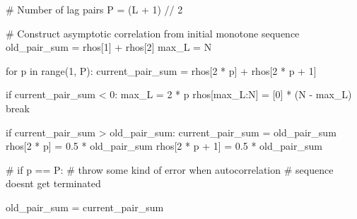 \documentclass[
  letterpaper,
  DIV=11,
  numbers=noendperiod]{scrartcl}
\newenvironment{Shaded}{\begin{snugshade}}{\end{snugshade}}
\newcommand{\BuiltInTok}[1]{\textcolor[rgb]{0.00,0.23,0.31}{#1}}
\newcommand{\CommentTok}[1]{\textcolor[rgb]{0.37,0.37,0.37}{#1}}
\newcommand{\ControlFlowTok}[1]{\textcolor[rgb]{0.00,0.23,0.31}{#1}}
\newcommand{\DecValTok}[1]{\textcolor[rgb]{0.68,0.00,0.00}{#1}}
\newcommand{\FloatTok}[1]{\textcolor[rgb]{0.68,0.00,0.00}{#1}}
\newcommand{\KeywordTok}[1]{\textcolor[rgb]{0.00,0.23,0.31}{#1}}
\newcommand{\NormalTok}[1]{\textcolor[rgb]{0.00,0.23,0.31}{#1}}
\newcommand{\OperatorTok}[1]{\textcolor[rgb]{0.37,0.37,0.37}{#1}}
\begin{document}
\begin{Shaded}
\begin{Highlighting}[]
  \CommentTok{\# Number of lag pairs}
\NormalTok{  P }\OperatorTok{=}\NormalTok{ (L }\OperatorTok{+} \DecValTok{1}\NormalTok{) }\OperatorTok{//} \DecValTok{2}
  
  \CommentTok{\# Construct asymptotic correlation from initial monotone sequence}
\NormalTok{  old\_pair\_sum }\OperatorTok{=}\NormalTok{ rhos[}\DecValTok{1}\NormalTok{] }\OperatorTok{+}\NormalTok{ rhos[}\DecValTok{2}\NormalTok{]}
\NormalTok{  max\_L }\OperatorTok{=}\NormalTok{ N}
  
  \ControlFlowTok{for}\NormalTok{ p }\KeywordTok{in} \BuiltInTok{range}\NormalTok{(}\DecValTok{1}\NormalTok{, P):}
\NormalTok{    current\_pair\_sum }\OperatorTok{=}\NormalTok{ rhos[}\DecValTok{2} \OperatorTok{*}\NormalTok{ p] }\OperatorTok{+}\NormalTok{ rhos[}\DecValTok{2} \OperatorTok{*}\NormalTok{ p }\OperatorTok{+} \DecValTok{1}\NormalTok{]}
    
    \ControlFlowTok{if}\NormalTok{ current\_pair\_sum }\OperatorTok{\textless{}} \DecValTok{0}\NormalTok{:}
\NormalTok{      max\_L }\OperatorTok{=} \DecValTok{2} \OperatorTok{*}\NormalTok{ p}
\NormalTok{      rhos[max\_L:N] }\OperatorTok{=}\NormalTok{ [}\DecValTok{0}\NormalTok{] }\OperatorTok{*}\NormalTok{ (N }\OperatorTok{{-}}\NormalTok{ max\_L)}
      \ControlFlowTok{break}
    
    \ControlFlowTok{if}\NormalTok{ current\_pair\_sum }\OperatorTok{\textgreater{}}\NormalTok{ old\_pair\_sum:}
\NormalTok{      current\_pair\_sum }\OperatorTok{=}\NormalTok{ old\_pair\_sum}
\NormalTok{      rhos[}\DecValTok{2} \OperatorTok{*}\NormalTok{ p]     }\OperatorTok{=} \FloatTok{0.5} \OperatorTok{*}\NormalTok{ old\_pair\_sum}
\NormalTok{      rhos[}\DecValTok{2} \OperatorTok{*}\NormalTok{ p }\OperatorTok{+} \DecValTok{1}\NormalTok{] }\OperatorTok{=} \FloatTok{0.5} \OperatorTok{*}\NormalTok{ old\_pair\_sum}
    
    \CommentTok{\# if p == P:}
      \CommentTok{\# throw some kind of error when autocorrelation}
      \CommentTok{\# sequence doesn\textquotesingle{}t get terminated}
    
\NormalTok{    old\_pair\_sum }\OperatorTok{=}\NormalTok{ current\_pair\_sum}
  
\end{Highlighting}
\end{Shaded}
\end{document}
